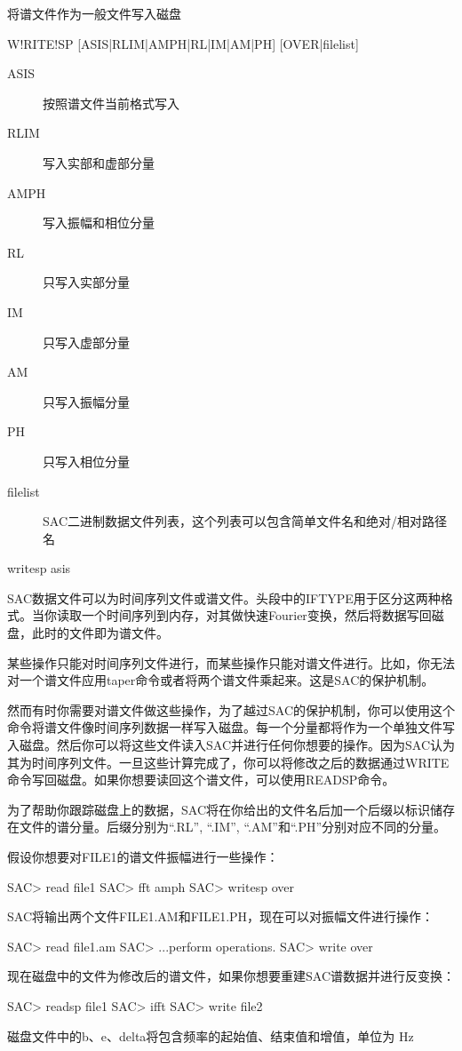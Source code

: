 \label{cmd:writesp}

将谱文件作为一般文件写入磁盘

\begin{SACSTX}
W!RITE!SP [ASIS|RLIM|AMPH|RL|IM|AM|PH] [OVER|filelist]
\end{SACSTX}

\begin{description}
\item [ASIS]  按照谱文件当前格式写入
\item [RLIM]  写入实部和虚部分量
\item [AMPH]  写入振幅和相位分量
\item [RL]  只写入实部分量
\item [IM]  只写入虚部分量
\item [AM]  只写入振幅分量
\item [PH]  只写入相位分量
\item [filelist]  SAC二进制数据文件列表，这个列表可以包含简单文件名和绝对/相对路径名
\end{description}

\begin{SACDFT}
writesp asis
\end{SACDFT}

SAC数据文件可以为时间序列文件或谱文件。头段中的IFTYPE用于区分这两种格式。当你读取一个时间序列到内存，对其做快速Fourier变换，然后将数据写回磁盘，此时的文件即为谱文件。

某些操作只能对时间序列文件进行，而某些操作只能对谱文件进行。比如，你无法对一个谱文件应用taper命令或者将两个谱文件乘起来。这是SAC的保护机制。

然而有时你需要对谱文件做这些操作，为了越过SAC的保护机制，你可以使用这个命令将谱文件像时间序列数据一样写入磁盘。每一个分量都将作为一个单独文件写入磁盘。然后你可以将这些文件读入SAC并进行任何你想要的操作。因为SAC认为其为时间序列文件。一旦这些计算完成了，你可以将修改之后的数据通过WRITE命令写回磁盘。如果你想要读回这个谱文件，可以使用READSP命令。

为了帮助你跟踪磁盘上的数据，SAC将在你给出的文件名后加一个后缀以标识储存在文件的谱分量。后缀分别为``.RL'', ``.IM'', ``.AM''和``.PH''分别对应不同的分量。

假设你想要对FILE1的谱文件振幅进行一些操作：
\begin{SACCode}
SAC> read file1
SAC> fft amph
SAC> writesp over
\end{SACCode}

SAC将输出两个文件FILE1.AM和FILE1.PH，现在可以对振幅文件进行操作：
\begin{SACCode}
SAC> read file1.am
SAC> ...perform operations.
SAC> write over
\end{SACCode}

现在磁盘中的文件为修改后的谱文件，如果你想要重建SAC谱数据并进行反变换：
\begin{SACCode}
SAC> readsp file1
SAC> ifft
SAC> write file2
\end{SACCode}

磁盘文件中的b、e、delta将包含频率的起始值、结束值和增值，单位为 \si{Hz}
